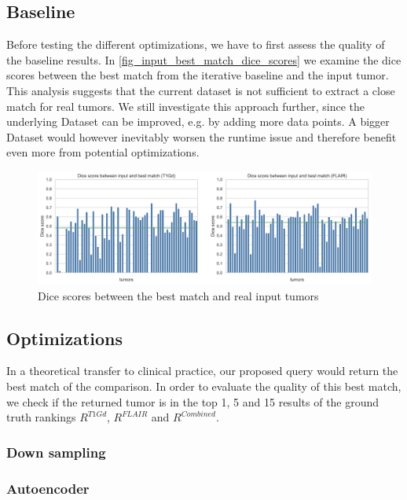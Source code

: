 \subsection{Baseline}
Before testing the different optimizations, we have to first assess the quality of the baseline results. 
In \autoref{fig_input_best_match_dice_scores} we examine the dice scores between the best match from the iterative baseline and the input tumor.
This analysis suggests that the current dataset is not sufficient to extract a close match for real tumors. 
We still investigate this approach further, since the underlying Dataset can be improved, e.g. by adding more data points.
A bigger Dataset would however inevitably worsen the runtime issue and therefore benefit even more from potential optimizations.
\begin{figure}[htbp]
  \centering
  \includegraphics[width=450pt]{figures/input_best_match_dice_scores.png}
  \caption{
  Dice scores between the best match and real input tumors 
  }\label{fig_input_best_match_dice_scores}
\end{figure}
\FloatBarrier
\subsection{Optimizations}
In a theoretical transfer to clinical practice, our proposed query would return the best match of the comparison. 
In order to evaluate the quality of this best match, we check if the returned tumor is in the top 1, 5 and 15 results of the ground truth rankings $R^{T1Gd}$, $R^{FLAIR}$ and $R^{Combined}$.
\subsubsection{Down sampling}
\subsubsection{Autoencoder}

